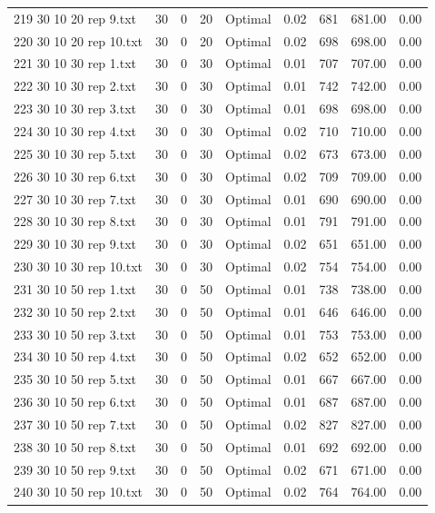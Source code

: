 \begin{longtable}{lrrllrrrr}
219 30 10 20 rep 9.txt & 30 & 0 & 20 & Optimal &  0.02 & 681 & 681.00 &  0.00\\
220 30 10 20 rep 10.txt & 30 & 0 & 20 & Optimal &  0.02 & 698 & 698.00 &  0.00\\
221 30 10 30 rep 1.txt & 30 & 0 & 30 & Optimal &  0.01 & 707 & 707.00 &  0.00\\
222 30 10 30 rep 2.txt & 30 & 0 & 30 & Optimal &  0.01 & 742 & 742.00 &  0.00\\
223 30 10 30 rep 3.txt & 30 & 0 & 30 & Optimal &  0.01 & 698 & 698.00 &  0.00\\
224 30 10 30 rep 4.txt & 30 & 0 & 30 & Optimal &  0.02 & 710 & 710.00 &  0.00\\
225 30 10 30 rep 5.txt & 30 & 0 & 30 & Optimal &  0.02 & 673 & 673.00 &  0.00\\
226 30 10 30 rep 6.txt & 30 & 0 & 30 & Optimal &  0.02 & 709 & 709.00 &  0.00\\
227 30 10 30 rep 7.txt & 30 & 0 & 30 & Optimal &  0.01 & 690 & 690.00 &  0.00\\
228 30 10 30 rep 8.txt & 30 & 0 & 30 & Optimal &  0.01 & 791 & 791.00 &  0.00\\
229 30 10 30 rep 9.txt & 30 & 0 & 30 & Optimal &  0.02 & 651 & 651.00 &  0.00\\
230 30 10 30 rep 10.txt & 30 & 0 & 30 & Optimal &  0.02 & 754 & 754.00 &  0.00\\
231 30 10 50 rep 1.txt & 30 & 0 & 50 & Optimal &  0.01 & 738 & 738.00 &  0.00\\
232 30 10 50 rep 2.txt & 30 & 0 & 50 & Optimal &  0.01 & 646 & 646.00 &  0.00\\
233 30 10 50 rep 3.txt & 30 & 0 & 50 & Optimal &  0.01 & 753 & 753.00 &  0.00\\
234 30 10 50 rep 4.txt & 30 & 0 & 50 & Optimal &  0.02 & 652 & 652.00 &  0.00\\
235 30 10 50 rep 5.txt & 30 & 0 & 50 & Optimal &  0.01 & 667 & 667.00 &  0.00\\
236 30 10 50 rep 6.txt & 30 & 0 & 50 & Optimal &  0.01 & 687 & 687.00 &  0.00\\
237 30 10 50 rep 7.txt & 30 & 0 & 50 & Optimal &  0.02 & 827 & 827.00 &  0.00\\
238 30 10 50 rep 8.txt & 30 & 0 & 50 & Optimal &  0.01 & 692 & 692.00 &  0.00\\
239 30 10 50 rep 9.txt & 30 & 0 & 50 & Optimal &  0.02 & 671 & 671.00 &  0.00\\
240 30 10 50 rep 10.txt & 30 & 0 & 50 & Optimal &  0.02 & 764 & 764.00 &  0.00\\

\end{longtable}
